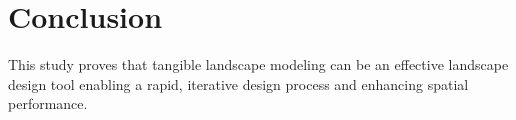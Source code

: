 \documentclass[Afour,sageh,times]{sagej}
\begin{document}






\clearpage

\section{Conclusion}
This study proves that tangible landscape modeling
can be an effective landscape design tool
enabling a rapid, iterative design process and
enhancing spatial performance.


\end{document}
